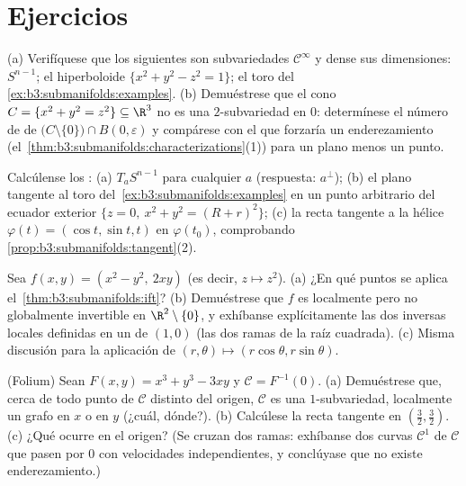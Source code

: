 \section{Ejercicios}

\begin{exercise}[$\star$]\label{exo:b3:submanifolds:1}
(a) Verifíquese que los siguientes son subvariedades $\mathcal C^\infty$
y dense sus dimensiones: $S^{n-1}$; el hiperboloide
$\{x^2 + y^2 - z^2 = 1\}$; el toro del
\cref{ex:b3:submanifolds:examples}.
(b) Demuéstrese que el cono $C = \{x^2 + y^2 = z^2\} \subseteq
\R^3$ no es una $2$-subvariedad en $0$: determínese el número de
 de
$\bigl(C\setminus\{0\}\bigr)\cap B(0,\varepsilon)$ y compárese con el
que forzaría un enderezamiento
(el~\cref{thm:b3:submanifolds:characterizations}(1)) para un plano menos
un punto.
\end{exercise}

\begin{exercise}[$\star$]\label{exo:b3:submanifolds:2}
Calcúlense los :
(a) $T_aS^{n-1}$ para cualquier $a$ (respuesta: $a^\perp$); (b) el plano
tangente al toro del~\cref{ex:b3:submanifolds:examples} en un punto
arbitrario del ecuador exterior $\{z = 0,\ x^2 + y^2 = (R + r)^2\}$; (c)
la recta tangente a la hélice $\varphi(t) = (\cos t,
\sin t, t)$ en $\varphi(t_0)$, comprobando
\cref{prop:b3:submanifolds:tangent}(2).
\end{exercise}

\begin{exercise}[$\star\star$]\label{exo:b3:submanifolds:3}
Sea $f(x, y) = (x^2 - y^2,\ 2xy)$ (es decir, $z \mapsto z^2$). (a) ¿En
qué puntos se aplica el~\cref{thm:b3:submanifolds:ift}? (b) Demuéstrese
que $f$ es localmente pero no globalmente invertible en
$\R^2\setminus\{0\}$, y exhíbanse explícitamente las dos inversas
locales definidas en un  de
$(1, 0)$ (las dos ramas de la raíz cuadrada). (c) Misma discusión para
la aplicación de  $(r,
\theta) \mapsto (r\cos\theta, r\sin\theta)$.
\end{exercise}

\begin{exercise}[$\star\star$]\label{exo:b3:submanifolds:4}
(Folium) Sean $F(x,y) = x^3 + y^3 - 3xy$ y $\mathcal C =
F^{-1}(0)$. (a) Demuéstrese que, cerca de todo punto de $\mathcal C$
distinto del origen, $\mathcal C$ es una $1$-subvariedad, localmente un
grafo en $x$ o en $y$ (¿cuál, dónde?). (b) Calcúlese la recta tangente
en $(\frac32, \frac32)$. (c) ¿Qué ocurre en el origen? (Se cruzan dos
ramas: exhíbanse dos curvas $\mathcal C^1$ de $\mathcal C$ que pasen por
$0$ con velocidades independientes, y conclúyase que no existe
enderezamiento.)
\end{exercise}


